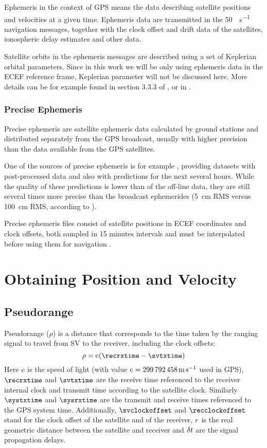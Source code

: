 Ephemeris in the context of GPS means the data describing satellite positions and velocities
at a given time.
Ephemeris data are transmitted in the \SI{50}{\bit\per\second} navigation messages,
together with the clock offset and drift data of the satellites, ionospheric
delay estimates and other data.

Satellite orbits in the ephemeris messages are described using a set of Keplerian orbital parameters.
Since in this work we will be only using ephemeris data in the ECEF reference frame, Keplerian parameter
will not be discussed here.
More details can be for example found in section 3.3.3 of \cite{rizos99}, or in \cite{kaplan06}.

\subsubsection{Precise Ephemeris}
Precise ephemeris are satellite ephemeris data calculated by ground stations
and distributed separately from the GPS broadcast, usually with higher precision
than the data available from the GPS satellites.

One of the sources of precise ephemeris is for example \cite{orbit-data}, providing datasets with
post-processed data and also with predictions for the next several hours.
While the quality of these predictions is lower than of the off-line data,
they are still several times more precise than the broadcast ephemerides
(\SI{5}{\centi\meter} RMS versus \SI{100}{\centi\meter} RMS, according to \cite{orbit-data}).

Precise ephemeris files consist of satellite positions in ECEF
coordinates and clock offsets, both sampled in 15 minutes intervals and must be interpolated
before using them for navigation \cite{schenewerk03}.

\section{Obtaining Position and Velocity}


\subsection{Pseudorange}
\label{sec:pseudorange}

Pseudorange (\(\rho\)) is a distance that corresponds to the time taken by the ranging
signal to travel from SV to the receiver, including the clock offsets:
\begin{equation}
	\label{eq:pseudorange}
	\rho = \speedoflight (\recrxtime - \svtxtime)
\end{equation}
Here \(\mathrm{c}\) is the speed of light (with value \(\mathrm{c} = \SI{299792458}{\meter\per\second}\) used in GPS),
\(\recrxtime\) and \(\svtxtime\) are the receive time referenced to the receiver internal clock
and transmit time according to the satellite clock.
Similarly \(\systxtime\) and \(\sysrxtime\) are the transmit and receive times referenced
to the GPS system time.
Additionally, \(\svclockoffset\) and \(\recclockoffset\) stand for the clock offset of the satellite
and of the receiver, \(r\) is the real geometric distance between the satellite and receiver
and \(\delta{t}\) are the signal propagation delays.

